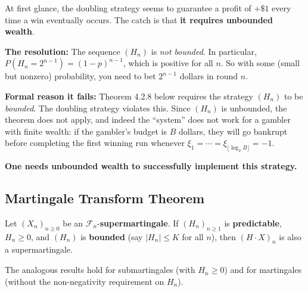\documentclass[12pt]{article}
\newcommand{\F}{\mathcal{F}}
\newcommand{\1}{\mathbf{1}}
\begin{document}
\begin{tcolorbox}[bluebox={Why the Doubling Strategy Doesn't Beat a Fair Game}]
At first glance, the doubling strategy seems to guarantee a profit of $+\$1$ every time
a win eventually occurs.  The catch is that \textbf{it requires unbounded wealth}.

\medskip
\textbf{The resolution:} The sequence $(H_n)$ is \emph{not bounded}.  In particular,
$P(H_n = 2^{n-1}) = (1-p)^{n-1}$, which is positive for all $n$.  So with some
(small but nonzero) probability, you need to bet $2^{n-1}$ dollars in round $n$.

\medskip
\textbf{Formal reason it fails:}  Theorem 4.2.8 below requires the strategy $(H_n)$ to be
\emph{bounded}.  The doubling strategy violates this.  Since $(H_n)$ is unbounded,
the theorem does not apply, and indeed the ``system'' does not work for a gambler with
finite wealth:  if the gambler's budget is $B$ dollars, they will go bankrupt before
completing the first winning run whenever $\xi_1 = \cdots = \xi_{\lfloor\log_2 B\rfloor} = -1$.

\medskip
\textbf{One needs unbounded wealth to successfully implement this strategy.}
\end{tcolorbox}

\subsection{Martingale Transform Theorem}

\begin{tcolorbox}[redbox={Theorem 4.2.8 (Martingale Transform)}]
Let $(X_n)_{n \ge 0}$ be an $\F_n$-\textbf{supermartingale}.  If $(H_n)_{n \ge 1}$ is
\textbf{predictable}, $H_n \ge 0$, and $(H_n)$ is \textbf{bounded} (say $|H_n| \le K$
for all $n$), then $(H \cdot X)_n$ is also a supermartingale.

\medskip\noindent
The analogous results hold for submartingales (with $H_n \ge 0$) and for martingales
(without the non-negativity requirement on $H_n$).
\end{tcolorbox}
\end{document}

